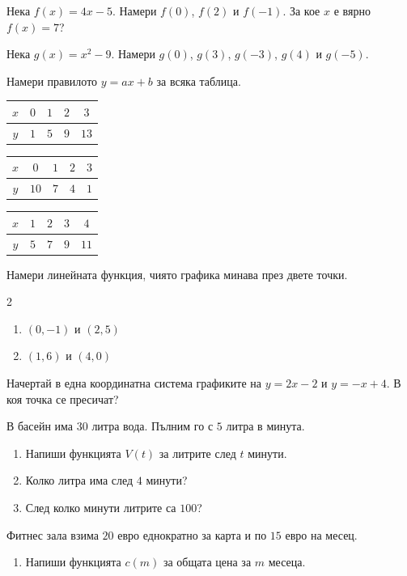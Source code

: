 \documentclass[11pt,a4paper]{article}
\makeatletter
\newcommand{\bgalph}[1]{\expandafter\@bgalph\csname c@#1\endcsname}
\newcommand{\@bgalph}[1]{\ifcase#1\or а\or б\or в\or г\or д\or е\or ж\or з\or и\or к\fi}
\makeatother
\begin{document}
\begin{tasks}
  \item Нека $f(x)=4x-5$. Намери $f(0)$, $f(2)$ и $f(-1)$. За кое $x$ е вярно $f(x)=7$?
  \item Нека $g(x)=x^2-9$. Намери $g(0)$, $g(3)$, $g(-3)$, $g(4)$ и $g(-5)$.
  \item Намери правилото $y=ax+b$ за всяка таблица.

  \begin{tabular}{c|cccc} $x$ & $0$ & $1$ & $2$ & $3$\\\hline $y$ & $1$ & $5$ & $9$ & $13$\end{tabular}
  \hspace{0.8cm}
  \begin{tabular}{c|cccc} $x$ & $0$ & $1$ & $2$ & $3$\\\hline $y$ & $10$ & $7$ & $4$ & $1$\end{tabular}
  \hspace{0.8cm}
  \begin{tabular}{c|cccc} $x$ & $1$ & $2$ & $3$ & $4$\\\hline $y$ & $5$ & $7$ & $9$ & $11$\end{tabular}
  \item Намери линейната функция, чиято графика минава през двете точки.
  \begin{multicols}{2}
  \begin{enumerate}[label=\bgalph*)]
    \item $(0,-1)$ и $(2,5)$
    \item $(1,6)$ и $(4,0)$
  \end{enumerate}
  \end{multicols}
  \item Начертай в една координатна система графиките на $y=2x-2$ и $y=-x+4$. В коя точка се пресичат?
  \item В басейн има $30$ литра вода. Пълним го с $5$ литра в минута.
  \begin{enumerate}[label=\bgalph*)]
    \item Напиши функцията $V(t)$ за литрите след $t$ минути.
    \item Колко литра има след $4$ минути?
    \item След колко минути литрите са $100$?
  \end{enumerate}
  \item Фитнес зала взима $20$ евро еднократно за карта и по $15$ евро на месец.
  \begin{enumerate}[label=\bgalph*)]
    \item Напиши функцията $c(m)$ за общата цена за $m$ месеца.

\end{enumerate}
\end{tasks}
\end{document}
